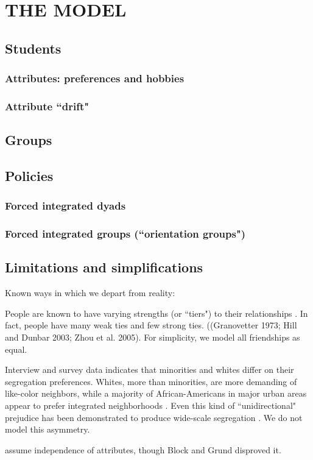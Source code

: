 
\section{THE MODEL}
\label{sec:model}

\subsection{Students}


\subsubsection{Attributes: preferences and hobbies}

\subsubsection{Attribute ``drift"}

\subsection{Groups}

\subsection{Policies}

\subsubsection{Forced integrated dyads}

\subsubsection{Forced integrated groups (``orientation groups")}


\subsection{Limitations and simplifications}

Known ways in which we depart from reality:

People are known to have varying strengths (or ``tiers") to their
relationships \cite{hirshman_leaving_2011}. In fact, people have many weak
ties and few strong ties. ((Granovetter 1973; Hill and Dunbar 2003; Zhou et
al. 2005). For simplicity, we model all friendships as equal.

Interview and survey data indicates that minorities and whites differ on their
segregation preferences. Whites, more than minorities, are more demanding of
like-color neighbors, while a majority of African-Americans in major urban
areas appear to prefer integrated neighborhoods
\cite{farley_residential_1997}. Even this kind of ``unidirectional" prejudice
has been demonstrated to produce wide-scale segregation
\cite{chen_emergence_2005}. We do not model this asymmetry.

assume independence of attributes, though Block and Grund disproved it.
